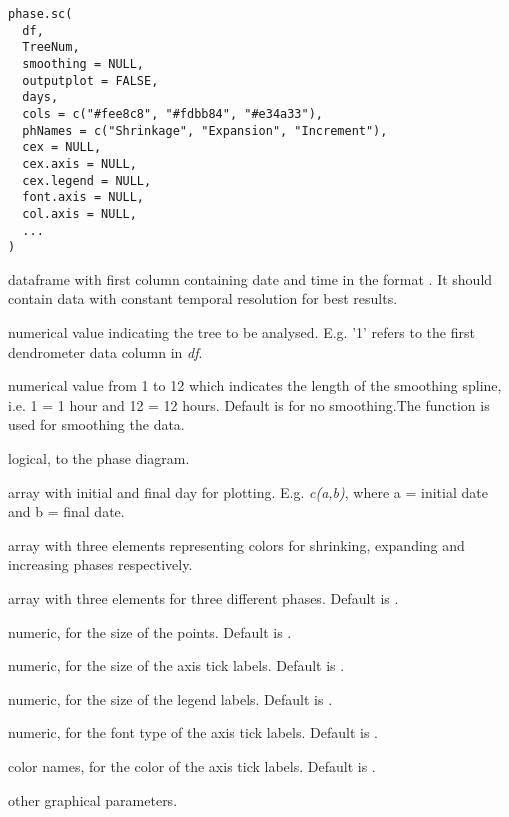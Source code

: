 \documentclass[a4paper]{book}
\begin{document}
%
\begin{Usage}
\begin{verbatim}
phase.sc(
  df,
  TreeNum,
  smoothing = NULL,
  outputplot = FALSE,
  days,
  cols = c("#fee8c8", "#fdbb84", "#e34a33"),
  phNames = c("Shrinkage", "Expansion", "Increment"),
  cex = NULL,
  cex.axis = NULL,
  cex.legend = NULL,
  font.axis = NULL,
  col.axis = NULL,
  ...
)
\end{verbatim}
\end{Usage}
%
\begin{Arguments}
\begin{ldescription}
\item[\code{df}] dataframe with first column containing date and time in the format . It should contain data with constant temporal resolution for best results.

\item[\code{TreeNum}] numerical value indicating the tree to be analysed. E.g. '1' refers to the first dendrometer data column in \emph{df}.

\item[\code{smoothing}] numerical value from 1 to 12 which indicates the length of the smoothing spline, i.e. 1 = 1 hour and 12 = 12 hours. Default is  for no smoothing.The function  is used for smoothing the data.

\item[\code{outputplot}] logical, to  the phase diagram.

\item[\code{days}] array with initial and final day for plotting. E.g. \emph{c(a,b)}, where a = initial date and b = final date.

\item[\code{cols}] array with three elements representing colors for shrinking, expanding and increasing phases respectively.

\item[\code{phNames}] array with three elements for three different phases. Default is .

\item[\code{cex}] numeric, for the size of the points. Default is .

\item[\code{cex.axis}] numeric, for the size of the axis tick labels. Default is .

\item[\code{cex.legend}] numeric, for the size of the legend labels. Default is .

\item[\code{font.axis}] numeric, for the font type of the axis tick labels. Default is .

\item[\code{col.axis}] color names, for the color of the axis tick labels. Default is .

\item[\code{...}] other graphical parameters.
\end{ldescription}
\end{Arguments}
\end{document}
